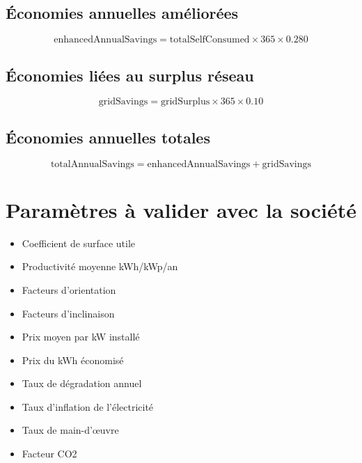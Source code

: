 \documentclass[12pt,a4paper]{article}
\begin{document}
\subsection{Économies annuelles améliorées}
\[
\text{enhancedAnnualSavings} = \text{totalSelfConsumed} \times 365 \times 0.280
\]

\subsection{Économies liées au surplus réseau}
\[
\text{gridSavings} = \text{gridSurplus} \times 365 \times 0.10
\]

\subsection{Économies annuelles totales}
\[
\text{totalAnnualSavings} = \text{enhancedAnnualSavings} + \text{gridSavings}
\]

\section{Paramètres à valider avec la société}
\begin{itemize}[leftmargin=1.5cm]
    \item Coefficient de surface utile
    \item Productivité moyenne kWh/kWp/an
    \item Facteurs d'orientation
    \item Facteurs d'inclinaison
    \item Prix moyen par kW installé
    \item Prix du kWh économisé
    \item Taux de dégradation annuel
    \item Taux d'inflation de l'électricité
    \item Taux de main-d'œuvre
    \item Facteur CO2
\end{itemize}
\end{document}
